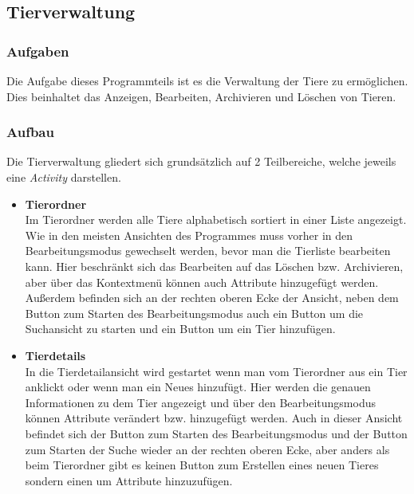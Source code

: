 \newpage
\subsection{Tierverwaltung}

\subsubsection{Aufgaben}
Die Aufgabe dieses Programmteils ist es die Verwaltung der Tiere zu ermöglichen. Dies beinhaltet das Anzeigen, Bearbeiten, Archivieren und Löschen von Tieren.

\subsubsection{Aufbau}
Die Tierverwaltung gliedert sich grundsätzlich auf 2 Teilbereiche, welche jeweils eine \textit{Activity} darstellen.
\begin{itemize}
\item{\textbf{Tierordner}}\\
Im Tierordner werden alle Tiere alphabetisch sortiert in einer Liste angezeigt. Wie in den meisten Ansichten des Programmes muss vorher in den Bearbeitungsmodus gewechselt werden, bevor man die Tierliste bearbeiten kann. Hier beschränkt sich das Bearbeiten auf das Löschen bzw. Archivieren, aber über das Kontextmenü können auch Attribute hinzugefügt werden. Außerdem befinden sich an der rechten oberen Ecke der Ansicht, neben dem Button zum Starten des Bearbeitungsmodus auch ein Button um die Suchansicht zu starten und ein Button um ein Tier hinzufügen.
\item{\textbf{Tierdetails}}\\
In die Tierdetailansicht wird gestartet wenn man vom Tierordner aus ein Tier anklickt oder wenn man ein Neues hinzufügt. Hier werden die genauen Informationen zu dem Tier angezeigt und über den Bearbeitungsmodus können Attribute verändert bzw. hinzugefügt werden. Auch in dieser Ansicht befindet sich der Button zum Starten des Bearbeitungsmodus und der Button zum Starten der Suche wieder an der rechten oberen Ecke, aber anders als beim Tierordner gibt es keinen Button zum Erstellen eines neuen Tieres sondern einen um Attribute hinzuzufügen.
\end{itemize}

